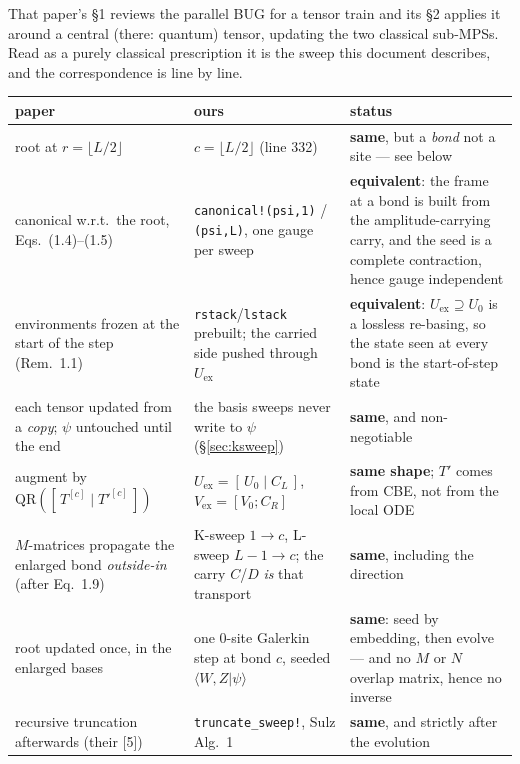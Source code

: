 \documentclass[11pt,a4paper]{article}
\newcommand{\code}[1]{\texttt{\small #1}}
\newcommand{\Uex}{U_{\mathrm{ex}}}
\newcommand{\Vex}{V_{\mathrm{ex}}}
\begin{document}
That paper's \S1 reviews the parallel BUG for a tensor train and its \S2 applies it around a
central (there: quantum) tensor, updating the two classical sub-MPSs. Read as a purely classical
prescription it is the sweep this document describes, and the correspondence is line by line.

\begin{center}
\small
\begin{tabular}{@{}p{5.0cm}p{4.6cm}p{5.0cm}@{}}
\toprule
\textbf{paper} & \textbf{ours} & \textbf{status} \\
\midrule
root at $r=\lfloor L/2\rfloor$ & $c=\lfloor L/2\rfloor$ (line 332) & \textbf{same}, but a
  \emph{bond} not a site --- see below \\
canonical w.r.t.\ the root, Eqs.\ (1.4)--(1.5) & \code{canonical!(psi,1)} / \code{(psi,L)}, one
  gauge per sweep & \textbf{equivalent}: the frame at a bond is built from the
  amplitude-carrying carry, and the seed is a complete contraction, hence gauge independent \\
environments frozen at the start of the step (Rem.\ 1.1) & \code{rstack}/\code{lstack} prebuilt;
  the carried side pushed through $\Uex$ & \textbf{equivalent}: $\Uex\supseteq U_0$ is a lossless
  re-basing, so the state seen at every bond is the start-of-step state \\
each tensor updated from a \emph{copy}; $\psi$ untouched until the end & the basis sweeps never
  write to $\psi$ (\S\ref{sec:ksweep}) & \textbf{same}, and non-negotiable \\
augment by $\mathrm{QR}([\,T^{[c]}\mid T'^{[c]}\,])$ & $\Uex=[\,U_0\mid C_L\,]$,
  $\Vex=[V_0;C_R]$ & \textbf{same shape}; $T'$ comes from CBE, not from the local ODE \\
$M$-matrices propagate the enlarged bond \emph{outside-in} (after Eq.\ 1.9) & K-sweep $1\to c$,
  L-sweep $L-1\to c$; the carry $C$/$D$ \emph{is} that transport & \textbf{same}, including the
  direction \\
root updated once, in the enlarged bases & one 0-site Galerkin step at bond $c$, seeded
  $\langle W,Z|\psi\rangle$ & \textbf{same}: seed by embedding, then evolve --- and no $M$ or $N$
  overlap matrix, hence no inverse \\
recursive truncation afterwards (their [5]) & \code{truncate\_sweep!}, Sulz Alg.\ 1 &
  \textbf{same}, and strictly after the evolution \\
\bottomrule
\end{tabular}
\end{center}
\end{document}
